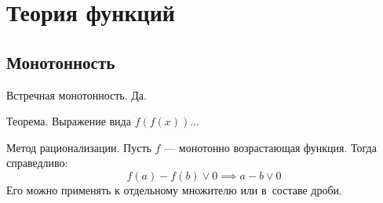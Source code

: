 \section{Теория функций}

\subsection{Монотонность}

\begin{theorem}
{\bold Встречная монотонность.} Да.
\end{theorem}
\begin{theorem}
{\bold Теорема.} Выражение вида $f(f(x))$...
\end{theorem}

\begin{theorem}
{\bold Метод рационализации.} Пусть $f$ --- монотонно возрастающая функция. Тогда справедливо:
$$f(a)-f(b)\lor 0\implies a-b\lor 0$$
Его можно применять к отдельному {\ital множителю} или в~составе {\ital дроби}.
\end{theorem}
